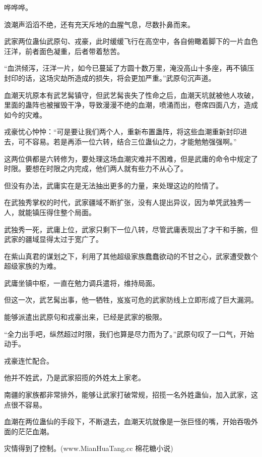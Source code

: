 
\begin{this_body}

哗哗哗。

浪潮声滔滔不绝，还有充天斥地的血腥气息，尽数扑鼻而来。

武家两位蛊仙武原句、戎豪，此时缓缓飞行在高空中，各自俯瞰着脚下的一片血色汪洋，前者面色凝重，后者带着愁苦。

“血洪倾泻，汪洋一片，如今已蔓延了方圆十数万里，淹没高山十多座，再不镇压封印的话，这场灾劫所造成的损失，将会更加严重。”武原句沉声道。

血潮天坑原本有武艺髯镇守，但武艺髯丧失了性命之后，血潮天坑就被他人攻破，里面的蛊阵也被摧毁干净，导致漫漫不绝的血潮，喷涌而出，卷席四面八方，造成如今的灾难。

戎豪忧心忡忡：“可是要让我们两个人，重新布置蛊阵，将这些血潮重新封印进去，可不容易。若是再添一位六转，结合三位蛊仙之力，才能勉勉强强啊。”

这两位俱都是六转修为，要处理这场血潮灾难并不困难，但是武庸的命令中规定了时限。要想在时限之内完成，他们两人就有些力不从心了。

但没有办法，武庸实在是无法抽出更多的力量，来处理这边的险情了。

在武独秀掌权的时代，武家疆域不断扩张，没有人提出异议，因为单凭武独秀一人，就能镇压得住整个局面。

武独秀一死，武庸上位，武家只剩下一位八转，尽管武庸表现出了才干和手腕，但武家的疆域显得太过于宽广了。

在紫山真君的谋划之下，利用了其他超级家族蠢蠢欲动的不甘之心，武家遭受数个超级家族的为难。

武庸坐镇中枢，一直在勉力调兵遣将，维持局面。

但这一次，武艺髯出事，他一牺牲，岌岌可危的武家防线上立即形成了巨大漏洞。

能够派遣出武原句和戎豪出来，已经是武家的极限。

“全力出手吧，纵然超过时限，我们也算是尽力而为了。”武原句叹了一口气，开始动手。

戎豪连忙配合。

他并不姓武，乃是武家招揽的外姓太上家老。

南疆的家族都非常排外，能够让武家打破常规，招揽一名外姓蛊仙，加入武家，这点很不容易。

血潮在两位蛊仙的手段下，不断退去，血潮天坑就像是一张巨怪的嘴，开始吞吸外面的茫茫血潮。

灾情得到了控制。(www.MianHuaTang.cc 棉花糖小说)


\end{this_body}
